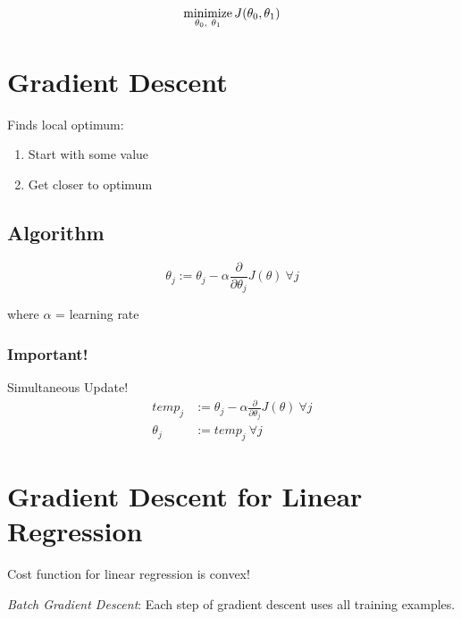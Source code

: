 \subsection*{}
\begin{equation*}
    \operatorname*{minimize}_{\theta_0,\ \theta_1} J(\theta_0, \theta_1)
\end{equation*}

\section{Gradient Descent}
Finds local optimum:
\begin{enumerate}
    \item Start with some value
    \item Get closer to optimum
\end{enumerate}

\subsection*{Algorithm}
\begin{equation*}
    \theta_j := \theta_j - \alpha\frac{\partial}{\partial\theta_j}J(\theta) \ \forall j
\end{equation*}

where $\alpha$ = learning rate

\subsubsection*{Important!}
Simultaneous Update!
\begin{align*}
    temp_j   & := \theta_j - \alpha\frac{\partial}{\partial\theta_j}J(\theta) \ \forall j \\
    \theta_j & := temp_j \ \forall j
\end{align*}

\section{Gradient Descent for Linear Regression}
Cost function for linear regression is convex!

\emph{Batch Gradient Descent}: Each step of gradient descent uses all training examples.

